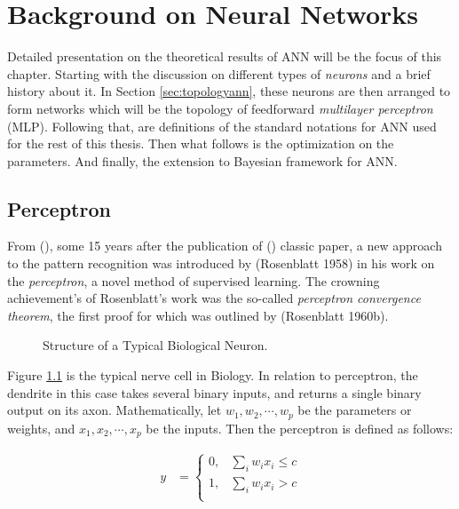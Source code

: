 \chapter{Background on Neural Networks}
Detailed presentation on the theoretical results of ANN will be the focus of this chapter. Starting with the discussion on different types of \textit{neurons} and a brief history about it. In Section \ref{sec:topologyann}, these neurons are then arranged to form networks which will be the topology of feedforward \textit{multilayer perceptron} (MLP). Following that, are definitions of the standard notations for ANN used for the rest of this thesis. Then what follows is the optimization on the parameters. And finally, the extension to Bayesian framework for ANN.
\section{Perceptron}
From (\cite{Haykin1998}), some 15 years after the publication of (\cite{mccullochpitts}) classic paper, a new approach to the pattern recognition was introduced by (Rosenblatt 1958) in his work on the \textit{perceptron}, a novel method of supervised learning. The crowning achievement's of Rosenblatt's work was the so-called \textit{perceptron convergence theorem}, the first proof for which was outlined by (Rosenblatt 1960b).

\begin{figure}[!h]
\caption[Structure of a Typical Biological Neuron]{\sc Structure of a Typical Biological Neuron.\protect\footnotemark}
\label{fig:neuron}
\end{figure}


Figure \ref{fig:neuron} is the typical nerve cell in Biology. In relation to perceptron, the dendrite in this case takes several binary inputs, and returns a single binary output on its axon. Mathematically, let $w_1,w_2,\cdots,w_p$ be the parameters or weights, and $x_1,x_2,\cdots, x_p$ be the inputs. Then the perceptron is defined as follows:

\begin{equation}
\label{eq:perceptron}
\begin{aligned}
y&=
\begin{cases}
0,& \sum_{i}w_i x_i\leq c\\
1,& \sum_{i}w_i x_i> c\\
\end{cases}
\end{aligned}
\end{equation}

